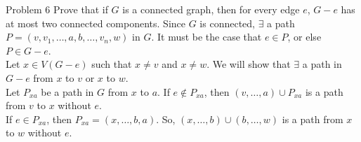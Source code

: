 \documentclass[8pt]{extarticle}
\begin{document}
    \begin{problem}{Problem 6}
      Prove that if $G$ is a connected graph, then for every edge $e$, $G-e$ has at most two connected components.
      \tcblower
    Since $G$ is connected, $\exists$ a path $P = (v,v_1,\dots,a,b,\dots,v_n,w)$ in $G$. It must be the case that $e\in P$, or else $P\in G-e$.\\

    Let $x\in V(G-e)$ such that $x\neq v$ and $x\neq w$. We will show that $\exists$ a path in $G-e$ from $x$ to $v$ or $x$ to $w$.\\

    Let $P_{xa}$ be a path in $G$ from $x$ to $a$. If $e\notin P_{xa}$, then $(v,\dots,a) \cup P_{xa}$ is a path from $v$ to $x$ without $e$.\\

    If $e\in P_{xa}$, then $P_{xa} = (x,\dots,b,a)$. So, $(x,\dots,b) \cup (b,\dots,w)$ is a path from $x$ to $w$ without $e$.
  \end{problem}
\end{document}
